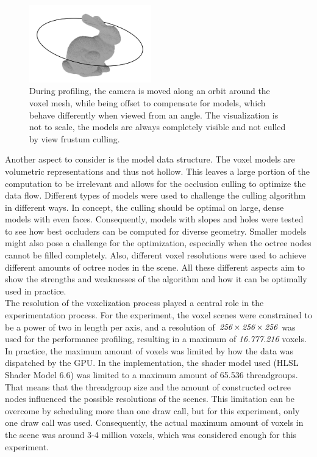 \begin{figure}[h]
    \centering
    \includegraphics[width=200px]{images/graphics/test-anim-camera-path.jpg}
    \caption{During profiling, the camera is moved along an orbit around the voxel mesh, while being offset to compensate 
    for models, which behave differently when viewed from an angle. The visualization is not to scale, the models 
    are always completely visible and not culled by view frustum culling.}
    \label{fig:test-anim-camera-path}
\end{figure}

Another aspect to consider is the model data structure. The voxel models are volumetric representations and thus 
not hollow. This leaves a large portion of the computation to be irrelevant and allows for the occlusion culling to 
optimize the data flow. Different types of models were used to challenge the culling algorithm in different ways. 
In concept, the culling should be optimal on large, dense models with even faces. Consequently, models with 
slopes and holes were tested to see how best occluders can be computed for diverse geometry. Smaller models might 
also pose a challenge for the optimization, especially when the octree nodes cannot be filled completely. Also, 
different voxel resolutions were used to achieve different amounts of octree nodes in the scene. All these different 
aspects aim to show the strengths and weaknesses of the algorithm and how it can be optimally used in practice. \\

\noindent
The resolution of the voxelization process played a central role in the experimentation process.
For the experiment, the voxel scenes were constrained to be a power of two in length per axis, and a resolution 
of $\emph{256} \times \emph{256} \times \emph{256}$ was used for the performance profiling, resulting in a maximum 
of \emph{16.777.216} voxels. In practice, the maximum amount of voxels was limited by how the data was dispatched 
by the \ac{GPU}. In the implementation, the shader model used (HLSL Shader Model 6.6) was limited to a maximum 
amount of 65.536 threadgroups. That means that the threadgroup size and the amount of constructed octree nodes 
influenced the possible resolutions of the scenes. This limitation can be overcome by scheduling more than one draw 
call, but for this experiment, only one draw call was used. Consequently, the actual maximum amount of voxels in the 
scene was around 3-4 million voxels, which was considered enough for this experiment.


